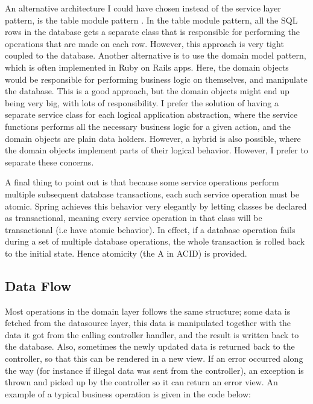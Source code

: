 An alternative architecture I could have chosen instead of the service layer pattern, is the table module pattern \cite{poea}. In the table module pattern,  all the SQL rows in the database gets a separate class that is responsible for performing the operations that are made on each row. However, this approach is very tight coupled to the database. Another alternative is to use the domain model pattern, which is often implemented in Ruby on Rails apps. Here, the domain objects would be responsible for performing business logic on themselves, and manipulate the database. This is a good approach, but the domain objects might end up being very big, with lots of responsibility. I prefer the solution of having a separate service class for each logical application abstraction, where the service functions performs all the necessary business logic for a given action, and the domain objects are plain data holders. However, a hybrid is also possible, where the domain objects implement parts of their logical behavior. However, I prefer to separate these concerns.
	
	
A final thing to point out is that because some service operations perform multiple  subsequent database transactions, each such service operation must be atomic. Spring achieves this behavior very elegantly by letting classes be declared as transactional, meaning every service operation in that class will be transactional (i.e have atomic behavior). In effect, if a database operation fails during a set of multiple database operations, the whole transaction is rolled back to the initial state. Hence atomicity (the A in ACID) is provided.  
	
\subsection{Data Flow}
Most operations in the domain layer follows the same structure; some data is fetched from the datasource layer, this data is manipulated together with the data it got from the calling controller handler, and the result is written back to the database. Also, sometimes the newly updated data is returned back to the controller, so that this can be rendered in a new view. If an error occurred along the way (for instance if illegal data was sent from the controller), an exception is thrown and picked up by the controller so it can return an error view. An example of a typical business operation is given in the code below:
	
